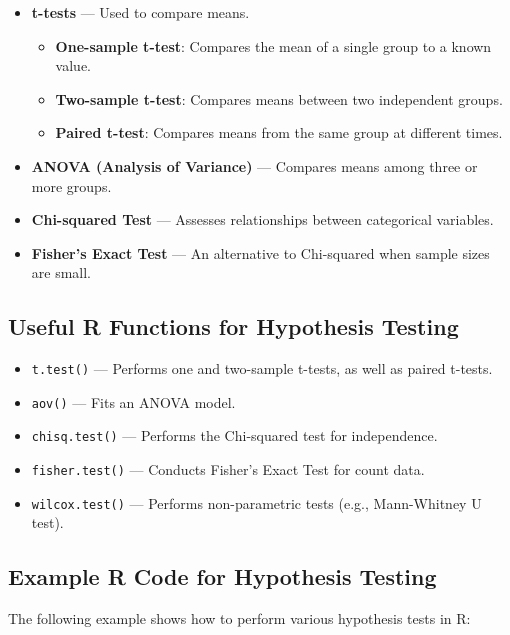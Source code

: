 \begin{itemize}
    \item \textbf{t-tests} --- Used to compare means.
        \begin{itemize}
            \item \textbf{One-sample t-test}: Compares the mean of a single group to a known value.
            \item \textbf{Two-sample t-test}: Compares means between two independent groups.
            \item \textbf{Paired t-test}: Compares means from the same group at different times.
        \end{itemize}
    \item \textbf{ANOVA (Analysis of Variance)} --- Compares means among three or more groups.
    \item \textbf{Chi-squared Test} --- Assesses relationships between categorical variables.
    \item \textbf{Fisher’s Exact Test} --- An alternative to Chi-squared when sample sizes are small.
\end{itemize}

\subsection{Useful R Functions for Hypothesis Testing}
\begin{itemize}
    \item \texttt{t.test()} --- Performs one and two-sample t-tests, as well as paired t-tests.
    \item \texttt{aov()} --- Fits an ANOVA model.
    \item \texttt{chisq.test()} --- Performs the Chi-squared test for independence.
    \item \texttt{fisher.test()} --- Conducts Fisher’s Exact Test for count data.
    \item \texttt{wilcox.test()} --- Performs non-parametric tests (e.g., Mann-Whitney U test).
\end{itemize}

\subsection{Example R Code for Hypothesis Testing}
The following example shows how to perform various hypothesis tests in R:

